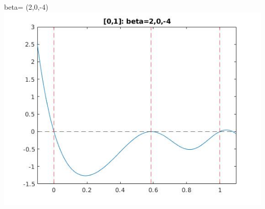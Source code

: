 \documentclass[11pt]{beamer}
\begin{document}
\begin{frame}{beta= (2,0,-4)}
\includegraphics[scale=0.18]{quadplots/01_2.jpg}
\end{frame}
\end{document}
